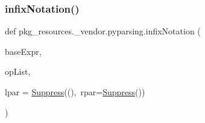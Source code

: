 \subsubsection{\texorpdfstring{infix\+Notation()}{infixNotation()}}
{\footnotesize\ttfamily def pkg\+\_\+resources.\+\_\+vendor.\+pyparsing.\+infix\+Notation (\begin{DoxyParamCaption}\item[{}]{base\+Expr,  }\item[{}]{op\+List,  }\item[{}]{lpar = {\ttfamily \hyperlink{classpkg__resources_1_1__vendor_1_1pyparsing_1_1_suppress}{Suppress}(\textquotesingle{}(\textquotesingle{}),~rpar=\hyperlink{classpkg__resources_1_1__vendor_1_1pyparsing_1_1_suppress}{Suppress}(\textquotesingle{})\textquotesingle{})} }\end{DoxyParamCaption})}

